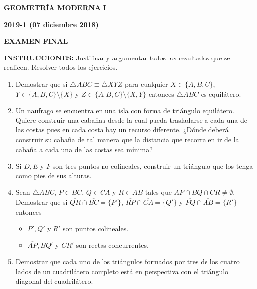 \documentclass[10pt]{report}
\begin{document}
\begin{center}
\textbf{\LARGE {GEOMETRÍA MODERNA I}}
\end{center}

\begin{center}
\textbf{{\large 2019-1 (07 diciembre 2018)}}
\end{center}

\begin{center}
\textbf{{\large EXAMEN FINAL}}
\end{center}

{\bf INSTRUCCIONES:} Justificar y argumentar todos los resultados que se realicen. Resolver todos los ejercicios.

\begin{enumerate}

\item Demostrar que si $\triangle ABC \equiv \triangle XYZ$ para cualquier $X \in \{A,B,C\}$, $Y \in \{A,B,C\}\setminus \{X\}$ y $Z \in \{A,B,C\}\setminus\{X,Y\}$ entonces $\triangle ABC$ es equilátero.

\item Un naufrago se encuentra en una isla con forma de triángulo equilátero. Quiere construir una
cabañaa desde la cual pueda trasladarse a cada una de las costas pues en cada costa hay un
recurso diferente. ¿Dónde deberá construir su cabaña de tal manera que la distancia que
recorra en ir de la cabaña a cada una de las costas sea mínima?

\item Si $D, E$ y $F$ son tres puntos no colineales, construir un triángulo que los tenga como pies de sus alturas.

\item Sean $\triangle ABC$, $P \in \overline{BC}$, $Q \in \overline{CA}$ y $R \in \overline{AB}$ tales que $\overline{AP}\cap \overline{BQ}\cap \overline{CR}\neq \emptyset$. Demostrar que si $\overline{QR} \cap \overline {BC}= \{P'\}$, $\overline{RP}\cap \overline {CA}= \{Q'\}$ y $\overline{PQ} \cap \overline {AB}= \{R'\}$ entonces
\begin{itemize}
\item  $P',Q'$ y $R'$ son puntos colineales.
\item $\overline{AP}, \overline{BQ'}$ y $\overline{CR'}$ son rectas concurrentes.
\end{itemize}

\item Demostrar que cada uno de los triángulos formados por tres de los cuatro lados de un cuadrilátero completo está en perspectiva con el triángulo diagonal del cuadrilátero.
\end{enumerate}
\end{document}
